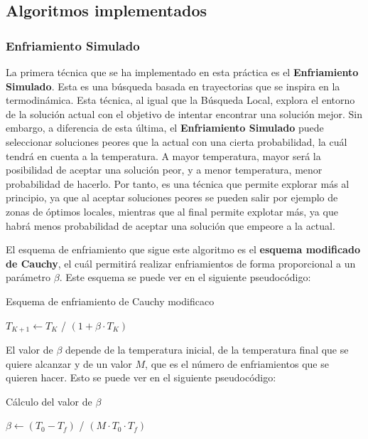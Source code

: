 \documentclass[11pt,a4paper]{article}
\begin{document}
\newpage

\subsection{Algoritmos implementados}

\subsubsection{Enfriamiento Simulado}

La primera técnica que se ha implementado en esta práctica es el \textbf{Enfriamiento Simulado}. Esta es una búsqueda basada
en trayectorias que se inspira en la termodinámica. Esta técnica, al igual que la Búsqueda Local, explora el entorno de la
solución actual con el objetivo de intentar encontrar una solución mejor. Sin embargo, a diferencia de esta última, el
\textbf{Enfriamiento Simulado} puede seleccionar soluciones peores que la actual con una cierta probabilidad, la cuál tendrá en
cuenta a la temperatura. A mayor temperatura, mayor será la posibilidad de aceptar una solución peor, y a menor temperatura,
menor probabilidad de hacerlo. Por tanto, es una técnica que permite explorar más al principio, ya que al aceptar soluciones
peores se pueden salir por ejemplo de zonas de óptimos locales, mientras que al final permite explotar más, ya que habrá menos
probabilidad de aceptar una solución que empeore a la actual.

El esquema de enfriamiento que sigue este algoritmo es el \textbf{esquema modificado de Cauchy}, el cuál permitirá realizar
enfriamientos de forma proporcional a un parámetro $\beta$. Este esquema se puede ver en el siguiente pseudocódigo:

\begin{algorithm}[H]
\caption{Esquema de enfriamiento de Cauchy modificaco}
\begin{algorithmic}[1]
\State $T_{K+1} \gets T_K$ / $(1 + \beta \cdot T_K)$
\State {}
\EndFunction
\end{algorithmic}
\end{algorithm}

El valor de $\beta$ depende de la temperatura inicial, de la temperatura final que se quiere alcanzar y de un valor $M$, que es
el número de enfriamientos que se quieren hacer. Esto se puede ver en el siguiente pseudocódigo:

\begin{algorithm}[H]
\caption{Cálculo del valor de $\beta$}
\begin{algorithmic}[1]
\State $\beta \gets (T_0 - T_f)$ / $(M \cdot T_0 \cdot T_f)$
\State \Return{$\beta$}
\EndFunction
\end{algorithmic}
\end{algorithm}
\end{document}
